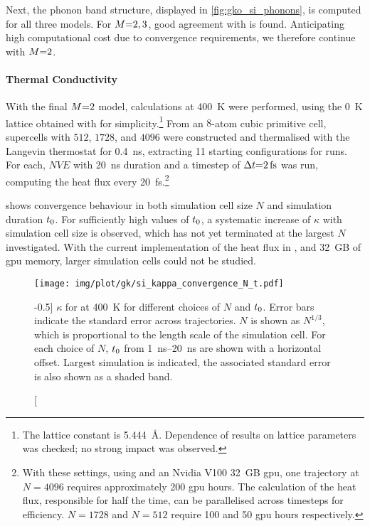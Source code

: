 Next, the phonon band structure, displayed in \cref{fig:gko_si_phonons}, is computed for all three models. For $M{=}2,3$, good agreement with \aims is found. Anticipating high computational cost due to convergence requirements, we therefore continue with $M{=}2$.

\paragraph{Thermal Conductivity}
With the final  $M{=}2$ model, \gk calculations at \qty{400}{K} were performed, using the \qty{0}{K} lattice obtained with \aims for simplicity.\footnote{The lattice constant is \qty{5.444}{\angstrom}. Dependence of results on lattice parameters was checked; no strong impact was observed.} 
From an $8$-atom cubic primitive cell, supercells with $512$, $1728$, and $4096$ were constructed and thermalised with the Langevin thermostat for \qty{0.4}{ns}, extracting \num{11} starting configurations for \gk runs.
For each, $NVE$ \md with \qty{20}{ns} duration and a timestep of $\Delta t{=}\qty{2}{fs}$ was run, computing the heat flux every \qty{20}{fs}.\footnote{With these settings, using \glpc and an Nvidia V100 \qty{32}{GB} \gls{gpu}, one trajectory at $N{=}4096$ requires approximately \num{200} \gls{gpu} hours. The calculation of the heat flux, responsible for half the time, can be parallelised across timesteps for efficiency. $N{=}1728$ and $N{=}512$ require 100 and 50 \gls{gpu} hours respectively.}

 shows convergence behaviour in both simulation cell size $N$ and simulation duration $t_0$. For sufficiently high values of $t_0$, a systematic increase of $\kappa$ with simulation cell size is observed, which has not yet terminated at the largest $N$ investigated. With the current implementation of the heat flux in \glpc, and \qty{32}{GB} of \gls{gpu} memory, larger simulation cells could not be studied.

\begin{figure}
  \texttt{[image: img/plot/gk/si\_kappa\_convergence\_N\_t.pdf]}
  \caption[][-0.5\baselineskip]{
  $\kappa$ for  at \qty{400}{K} for different choices of $N$ and $t_0$.
  Error bars indicate the standard error across trajectories.
  $N$ is shown as $N^{1/3}$, which is proportional to the length scale of the simulation cell.
  For each choice of $N$, $t_0$ from \qtyrange{1}{20}{ns} are shown with a horizontal offset.
  Largest simulation is indicated, the associated standard error is also shown as a shaded band.
  }
  \label{fig:gko_si_kappa_convergence_N_t}
\end{figure}

